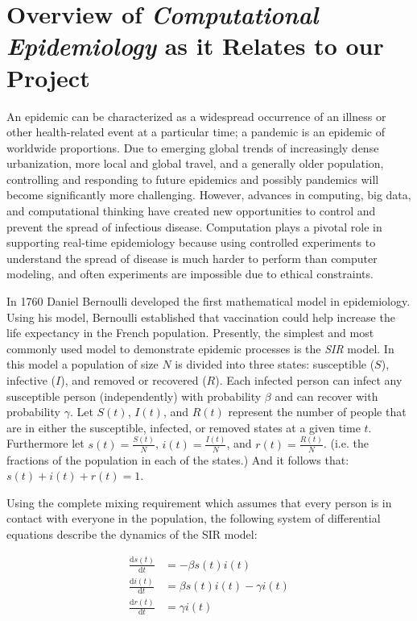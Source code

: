 \documentclass[12pt, oneside, openany]{article} %
\newcommand{\deriv}[2]{\frac{\mathrm d #1}{\mathrm d #2}}
\begin{document}

\tableofcontents
\newpage

\section{Overview of \textit{Computational Epidemiology} as it Relates to our Project}
An epidemic can be characterized as a widespread occurrence of an illness or other health-related event at a particular time; a pandemic is an epidemic of worldwide proportions. Due to emerging global trends of increasingly dense urbanization, more local and global travel, and a generally older population, controlling and responding to future epidemics and possibly pandemics will become significantly more challenging. However, advances in computing, big data, and computational thinking have created new opportunities to control and prevent the spread of infectious disease. Computation plays a pivotal role in supporting real-time epidemiology because using controlled experiments to understand the spread of disease is much harder to perform than computer modeling, and often experiments are impossible due to ethical constraints. 

In 1760 Daniel Bernoulli developed the first mathematical model in epidemiology. Using his model, Bernoulli established that vaccination could help increase the life expectancy in the French population. Presently, the simplest and most commonly used model to demonstrate epidemic processes is the \emph{SIR} model. In this model a population of size $N$ is divided into three states: susceptible ($S$), infective ($I$), and removed or recovered ($R$). Each infected person can infect any susceptible person (independently) with probability $\beta$ and can recover with probability $\gamma$. Let $S(t)$, $I(t)$, and $R(t)$ represent the number of people that are in either the susceptible, infected, or removed states at a given time $t$. Furthermore let $s(t) = \frac{S(t)}{N}$, $i(t) = \frac{I(t)}{N}$, and $r(t) = \frac{R(t)}{N}$. (i.e. the fractions of the population in each of the states.) And it follows that: $s(t) + i(t) + r(t) = 1$. 

Using the complete mixing requirement which assumes that every person is in contact with everyone in the population, the following system of differential equations describe the dynamics of the SIR model:

\begin{align}
	\deriv{s(t)}{t} &= -\beta s(t) i(t) \\
	\deriv{i(t)}{t} &= \beta s(t) i(t) - \gamma i(t) \\
	\deriv{r(t)}{t} &= \gamma i(t)
\end{align}
\end{document}
